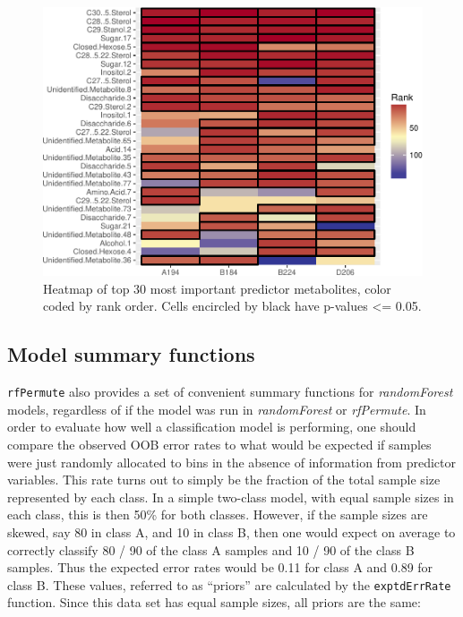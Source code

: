 \documentclass[]{article}
\begin{document}
\begin{figure}[htbp]
\centering
\includegraphics{rfPermute_ms_files/figure-latex/impHeatmap-1.pdf}
\caption{Heatmap of top 30 most important predictor metabolites, color
coded by rank order. Cells encircled by black have p-values \textless{}=
0.05.}
\end{figure}

\subsection{Model summary functions}\label{model-summary-functions}

\texttt{rfPermute} also provides a set of convenient summary functions
for \emph{randomForest} models, regardless of if the model was run in
\emph{randomForest} or \emph{rfPermute}. In order to evaluate how well a
classification model is performing, one should compare the observed OOB
error rates to what would be expected if samples were just randomly
allocated to bins in the absence of information from predictor
variables. This rate turns out to simply be the fraction of the total
sample size represented by each class. In a simple two-class model, with
equal sample sizes in each class, this is then 50\% for both classes.
However, if the sample sizes are skewed, say 80 in class A, and 10 in
class B, then one would expect on average to correctly classify 80 / 90
of the class A samples and 10 / 90 of the class B samples. Thus the
expected error rates would be 0.11 for class A and 0.89 for class B.
These values, referred to as ``priors'' are calculated by the
\texttt{exptdErrRate} function. Since this data set has equal sample
sizes, all priors are the same:
\end{document}
